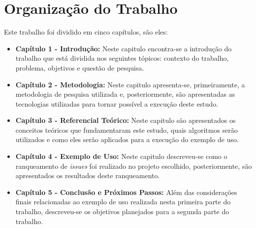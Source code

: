\section{Organização do Trabalho}
\label{int:org}
Este trabalho foi dividido em cinco capítulos, são eles:

\begin{itemize}
    \item \textbf{Capítulo 1 - Introdução:} Neste capitulo encontra-se a introdução do trabalho que está dividida nos seguintes tópicos: contexto do trabalho, problema, objetivos e questão de pesquisa.
    \item \textbf{Capítulo 2 - Metodologia:} Neste capitulo apresenta-se, primeiramente, a metodologia de pesquisa utilizada e, posteriormente, são apresentadas as tecnologias utilizadas para tornar possível a execução deste estudo.
    \item \textbf{Capítulo 3 - Referencial Teórico:} Neste capitulo são apresentados os conceitos teóricos que fundamentaram este estudo, quais algoritmos serão utilizados e como eles serão aplicados para a execução do exemplo de uso.
    \item \textbf{Capítulo 4 - Exemplo de Uso:} Neste capitulo descreveu-se como o ranqueamento de \textit{issues} foi realizado no projeto escolhido, posteriormente, são apresentados os resultados deste ranqueamento.
    \item \textbf{Capítulo 5 - Conclusão e Próximos Passos:} Além das considerações finais relacionadas ao exemplo de uso realizada nesta primeira parte do trabalho, descreveu-se os objetivos planejados para a segunda parte do trabalho.
\end{itemize}
